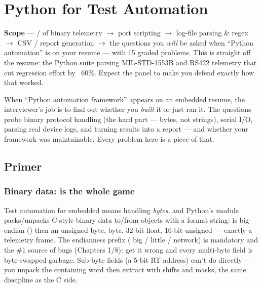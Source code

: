 \chapter{Python for Test Automation}
\label{ch:python-automation}

\begin{partnote}
\textbf{Scope} --- / of binary telemetry
$\rightarrow$  port scripting $\rightarrow$ log-file parsing \&
regex $\rightarrow$ CSV / report generation $\rightarrow$ the questions you
\emph{will} be asked when ``Python automation'' is on your resume --- with 15
graded problems. This is straight off the resume: the Python suite parsing
MIL-STD-1553B and RS422 telemetry that cut regression effort by ~60\%. Expect
the panel to make you defend exactly how that worked.
\end{partnote}

When ``Python automation framework'' appears on an embedded resume, the
interviewer's job is to find out whether you \emph{built} it or just ran it.
The questions probe binary protocol handling (the hard part --- bytes, not
strings), serial I/O, parsing real device logs, and turning results into a
report --- and whether your framework was maintainable. Every problem here is a
piece of that.

\section{Primer}

\subsection{Binary data:  is the whole game}

Test automation for embedded means handling \emph{bytes}, and Python's
 module packs/unpacks C-style binary data to/from 
objects with a format string:  is big-endian (\code{>}) then an
unsigned byte, byte, 32-bit float, 16-bit unsigned --- exactly a telemetry
frame. The endianness prefix (\code{>} big / \code{<} little / \code{!}
network) is mandatory and the \#1 source of bugs (Chapters 1/8): get it wrong
and every multi-byte field is byte-swapped garbage. Sub-byte fields (a 5-bit RT
address)  can't do directly --- you unpack the containing word then
extract with shifts and masks, the same discipline as the C side.

